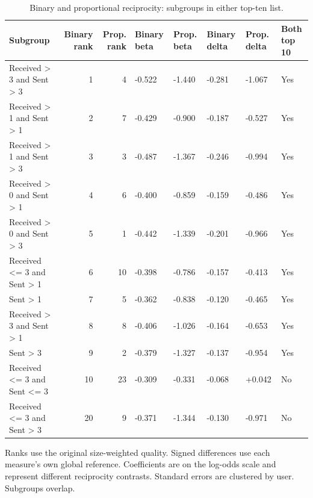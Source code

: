 \begin{table}[t]
\centering
\small
\setlength{\tabcolsep}{3pt}
\caption{Binary and proportional reciprocity: subgroups in either top-ten list.}
\begin{tabular}{lrrlllll}
\toprule
Subgroup & Binary rank & Prop. rank & Binary beta & Prop. beta & Binary delta & Prop. delta & Both top 10 \\
\midrule
Received > 3 and Sent > 3 & 1 & 4 & -0.522 & -1.440 & -0.281 & -1.067 & Yes \\
Received > 1 and Sent > 1 & 2 & 7 & -0.429 & -0.900 & -0.187 & -0.527 & Yes \\
Received > 1 and Sent > 3 & 3 & 3 & -0.487 & -1.367 & -0.246 & -0.994 & Yes \\
Received > 0 and Sent > 1 & 4 & 6 & -0.400 & -0.859 & -0.159 & -0.486 & Yes \\
Received > 0 and Sent > 3 & 5 & 1 & -0.442 & -1.339 & -0.201 & -0.966 & Yes \\
Received <= 3 and Sent > 1 & 6 & 10 & -0.398 & -0.786 & -0.157 & -0.413 & Yes \\
Sent > 1 & 7 & 5 & -0.362 & -0.838 & -0.120 & -0.465 & Yes \\
Received > 3 and Sent > 1 & 8 & 8 & -0.406 & -1.026 & -0.164 & -0.653 & Yes \\
Sent > 3 & 9 & 2 & -0.379 & -1.327 & -0.137 & -0.954 & Yes \\
Received <= 3 and Sent <= 3 & 10 & 23 & -0.309 & -0.331 & -0.068 & +0.042 & No \\
Received <= 3 and Sent > 3 & 20 & 9 & -0.371 & -1.344 & -0.130 & -0.971 & No \\
\bottomrule
\end{tabular}
\begin{minipage}{\textwidth}
\footnotesize
Ranks use the original size-weighted quality. Signed differences use each measure's own global reference. Coefficients are on the log-odds scale and represent different reciprocity contrasts. Standard errors are clustered by user. Subgroups overlap.
\end{minipage}
\end{table}
